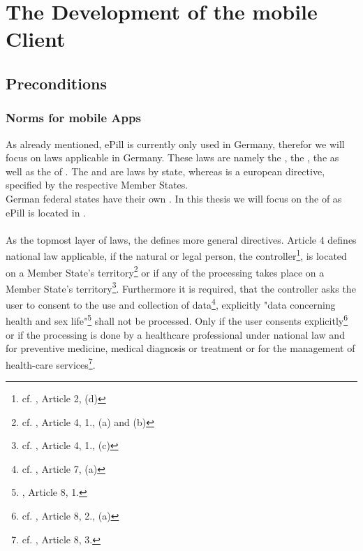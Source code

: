 \section{The Development of the mobile Client}
\subsection{Preconditions}
\subsubsection{Norms for mobile Apps}
As already mentioned, ePill is currently only used in Germany, therefor we will focus on laws applicable in Germany. These laws are namely the \TKGns, the \TMGns, the \REG as well as the \DPA of \NRWns. The \TKG and \TMG are laws by state, whereas \REG is a european directive, specified by the respective Member States. 
\\
German federal states have their own \DPAsns. In this thesis we will focus on the \DPA of \NRW as ePill is located in \NRWns.
\\
\\
As the topmost layer of laws, the \REG defines more general directives. Article 4 defines national law applicable, if the natural or legal person, the controller\footnote{cf. \cite{TheEuropeanParliamentandtheCounciloftheEuropeanUnion.24.10.1995}, Article 2, (d)}, is located on a Member State's territory\footnote{cf. \cite{TheEuropeanParliamentandtheCounciloftheEuropeanUnion.24.10.1995}, Article 4, 1., (a) and (b)} or if any of the processing takes place on a Member State's territory\footnote{cf. \cite{TheEuropeanParliamentandtheCounciloftheEuropeanUnion.24.10.1995}, Article 4, 1., (c)}. Furthermore it is required, that the controller asks the user to consent to the use and collection of data\footnote{cf. \cite{TheEuropeanParliamentandtheCounciloftheEuropeanUnion.24.10.1995}, Article 7, (a)}, explicitly "data concerning health and sex life"\footnote{\cite{TheEuropeanParliamentandtheCounciloftheEuropeanUnion.24.10.1995}, Article 8, 1.} shall not be processed. Only if the user consents explicitly\footnote{cf. \cite{TheEuropeanParliamentandtheCounciloftheEuropeanUnion.24.10.1995}, Article 8, 2., (a)} or if the processing is done by a healthcare professional under national law and for preventive medicine, medical diagnosis or treatment or for the management of health-care services\footnote{cf. \cite{TheEuropeanParliamentandtheCounciloftheEuropeanUnion.24.10.1995}, Article 8, 3.}. 
\\
